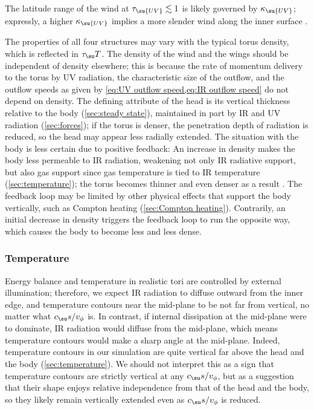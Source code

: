 \documentclass[twocolumn]{article}
\begin{document}
The latitude range of the wind at $\tau_\su{UV}\lesssim1$ is likely governed by
$\kappa_\su{UV}$; expressly, a higher $\kappa_\su{UV}$ implies a more slender
wind along the inner surface .

The properties of all four structures may vary with the typical torus density,
which is reflected in $\tau_\su T$. The density of the wind and the wings
should be independent of density elsewhere; this is because the rate of
momentum delivery to the torus by \ac{UV} radiation, the characteristic size of
the outflow, and the outflow speeds as given by \cref{eq:UV outflow speed,eq:IR
outflow speed} do not depend on density. The defining attribute of the head is
its vertical thickness relative to the body (\cref{sec:steady state}),
maintained in part by \ac{IR} and \ac{UV} radiation (\cref{sec:forces}); if the
torus is denser, the penetration depth of radiation is reduced, so the head may
appear less radially extended. The situation with the body is less certain due
to positive feedback: An increase in density makes the body less permeable to
\ac{IR} radiation, weakening not only \ac{IR} radiative support, but also gas
support since gas temperature is tied to \ac{IR} temperature
(\cref{sec:temperature}); the torus becomes thinner and even denser as a result
\citep[see also][]{2012ApJ...759...36R}. The feedback loop may be limited by
other physical effects that support the body vertically, such as Compton
heating (\cref{sec:Compton heating}). Contrarily, an initial decrease in
density triggers the feedback loop to run the opposite way, which causes the
body to become less and less dense.

\subsubsection{Temperature}
\label{sec:realistic temperature}

Energy balance and temperature in realistic tori are controlled by external
illumination; therefore, we expect \ac{IR} radiation to diffuse outward from
the inner edge, and temperature contours near the mid-plane to be not far from
vertical, no matter what $c_\su s/v_\phi$ is. In contrast, if internal
dissipation at the mid-plane were to dominate, \ac{IR} radiation would diffuse
from the mid-plane, which means temperature contours would make a sharp angle
at the mid-plane. Indeed, temperature contours in our simulation are quite
vertical far above the head and the body (\cref{sec:temperature}). We should
not interpret this as a sign that temperature contours are strictly vertical at
any $c_\su s/v_\phi$, but as a suggestion that their shape enjoys relative
independence from that of the head and the body, so they likely remain
vertically extended even as $c_\su s/v_\phi$ is reduced.
\end{document}
